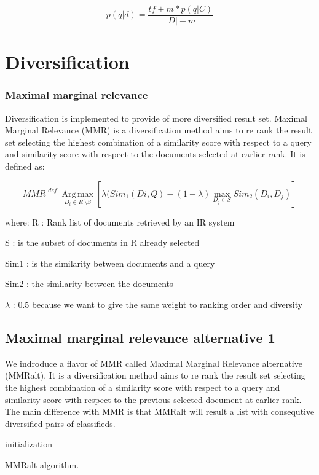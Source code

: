 \begin{equation}
p(q|d) =\frac{tf + m * p(q|C) }{|D| + m}
\end{equation}


\section{Diversification}

\subsubsection{Maximal marginal relevance}
Diversification is implemented to provide of more diversified result set. Maximal Marginal Relevance (MMR) is a diversification method aims to re rank the result set selecting the highest combination of a similarity score with respect to a query and similarity score with respect to the documents selected at earlier rank. It is defined as:


\begin{equation}
MMR\overset{def}{=}\operatorname*{Arg\, \max}_{D_{i} \in R\ \setminus S}[\lambda(Sim_{1}(Di,Q)-(1-\lambda)\underset{{D_{j}\in S}}{\max}Sim_{2}(D_{i},D_{j})]
\end{equation}

where:
R : Rank list of documents retrieved by an IR system

S : is the subset of documents in R already selected

Sim1 : is the similarity between documents and a query

Sim2 : the similarity between the documents

$\lambda$ : 0.5 because we want to give the same weight to ranking order and diversity


\subsection{Maximal marginal relevance alternative 1}

We indroduce a flavor of MMR called Maximal Marginal Relevance alternative (MMRalt). It is a diversification method aims to re rank the result set selecting the highest combination of a similarity score with respect to a query and similarity score with respect to the previous selected document at earlier rank. The main difference with MMR is that MMRalt will result a list with consequtive diversified pairs of classifieds. 


\begin{algorithm}[H]
 initialization\;
 \caption{MMRalt algorithm.}
\end{algorithm}


